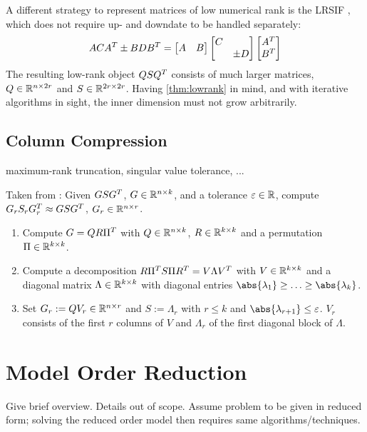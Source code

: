 A different strategy to represent matrices of low numerical rank is the \ac{LRSIF} \cite{Benner2009,Lang2015},
which does not require up- and downdate to be handled separately:
\begin{equation}
  ACA^T \pm BDB^T =
  \begin{bmatrix}
    A & B
  \end{bmatrix}
  \begin{bmatrix}
    C \\ & \pm D
  \end{bmatrix}
  \begin{bmatrix}
    A^T \\ B^T
  \end{bmatrix}
\end{equation}
The resulting low-rank object $QSQ^T$ consists of much larger matrices,
$Q \in\mathbb{R}^{n\times 2r}$ and $S\in\mathbb{R}^{2r\times 2r}$.
Having \autoref{thm:lowrank} in mind,
and with iterative algorithms in sight,
the inner dimension must not grow arbitrarily.

\subsection{Column Compression}
\label{sec:lr:compression}

maximum-rank truncation,
singular value tolerance,
...

Taken from \cite[Section 6.3.3]{Lang2017}:
Given $GSG^T$, $G\in\mathbb{R}^{n\times k}$, and a tolerance $\varepsilon\in\mathbb{R}$,
compute $G_rS_rG_r^T \approx GSG^T$, $G_r\in\mathbb{R}^{n\times r}$.
\begin{enumerate}
  \item
    Compute $G=QR\Pi^T$ with $Q\in\mathbb{R}^{n\times k}$, $R\in\mathbb{R}^{k\times k}$ and a permutation $\Pi\in\mathbb{R}^{k\times k}$.
  \item
    Compute a decomposition $R \Pi^T S \Pi R^T = V \Lambda V^T$ with $V \in \mathbb{R}^{k\times k}$
    and a diagonal matrix $\Lambda\in\mathbb{R}^{k\times k}$ with diagonal entries $\abs{\lambda_1}\geq\ldots\geq\abs{\lambda_k}$.
  \item
    Set $G_r := QV_r \in\mathbb{R}^{n\times r}$ and $S := \Lambda_r$ with $r\leq k$ and $\abs{\lambda_{r+1}}\leq\epsilon$.
    $V_r$ consists of the first $r$ columns of $V$ and $\Lambda_r$ of the first diagonal block of $\Lambda$.
\end{enumerate}


\section{Model Order Reduction}
Give brief overview.
Details out of scope.
Assume problem to be given in reduced form;
solving the reduced order model then requires same algorithms/techniques.
